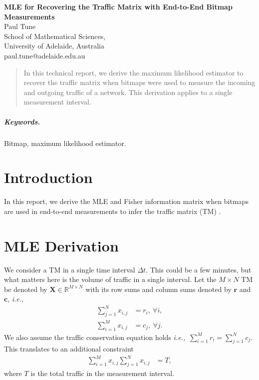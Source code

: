 \documentclass[12pt]{article}
\numberwithin{equation}{section}
\numberwithin{table}{section}
\numberwithin{figure}{section}
\newcommand{\Real}{\mathbb R}
\def\ie{\textit{i.e.,}}
\def\bX{\mathbf{X}}
\def\bc{\mathbf{c}}
\def\br{\mathbf{r}}
\begin{document}

\begin{center}
\textbf{\Large MLE for Recovering the Traffic Matrix with End-to-End Bitmap Measurements} \\[6pt]
  Paul Tune \\[6pt]
  School of Mathematical Sciences,\\
  University of Adelaide, Australia  \\[6pt]
  paul.tune@adelaide.edu.au
\end{center}

\begin{abstract}
In this technical report, we derive the maximum likelihood estimator to recover the traffic matrix when bitmaps were used to measure the 
incoming and outgoing traffic of a network. This derivation applies to a single measurement interval.
\end{abstract}

\subparagraph{Keywords.} Bitmap, maximum likelihood estimator.

\section{Introduction}

In this report, we derive the MLE and Fisher information matrix when bitmaps are used in end-to-end measurements to infer the traffic matrix 
(TM) \cite{Zhao05TM}.

\section{MLE Derivation}

We consider a TM in a single time interval $\Delta t$. This could be a few minutes, but what matters here is the volume of traffic 
in a single interval. Let the $M \times N$ TM be denoted by $\bX \in \Real^{M \times N}$ with its row sums and column sums denoted by $\br$ and $\bc$, \ie
\begin{align*}
\sum_{j=1}^N x_{i,j} &= r_i,\ \forall i,\\
\sum_{i=1}^M x_{i,j} &= c_j,\ \forall j.
\end{align*}
We also assume the traffic conservation equation holds \ie~$\sum_{i=1}^M r_i = \sum_{j=1}^N c_j$. This translates to an additional constraint
\begin{align*}
\sum_{i=1}^M x_{i,j}  \sum_{j=1}^N x_{i,j} &= T,
\end{align*}
where $T$ is the total traffic in the measurement interval.
\end{document}
